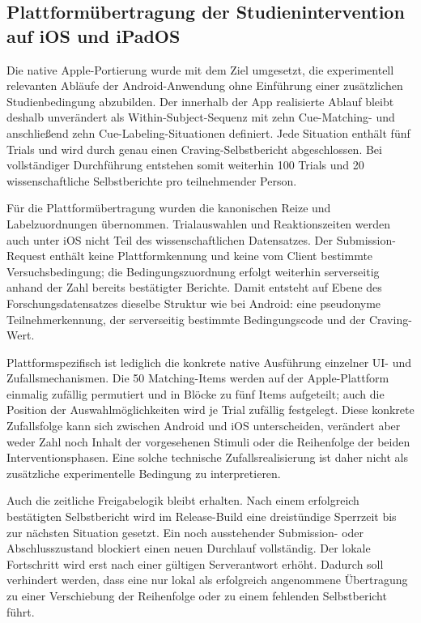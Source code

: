 
\begin{neu}
\section{Plattformübertragung der Studienintervention auf iOS und iPadOS}

Die native Apple-Portierung wurde mit dem Ziel umgesetzt, die experimentell relevanten Abläufe der Android-Anwendung ohne Einführung einer zusätzlichen Studienbedingung abzubilden. Der innerhalb der App realisierte Ablauf bleibt deshalb unverändert als Within-Subject-Sequenz mit zehn Cue-Matching- und anschließend zehn Cue-Labeling-Situationen definiert. Jede Situation enthält fünf Trials und wird durch genau einen Craving-Selbstbericht abgeschlossen. Bei vollständiger Durchführung entstehen somit weiterhin 100 Trials und 20 wissenschaftliche Selbstberichte pro teilnehmender Person.

Für die Plattformübertragung wurden die kanonischen Reize und Labelzuordnungen übernommen. Trialauswahlen und Reaktionszeiten werden auch unter iOS nicht Teil des wissenschaftlichen Datensatzes. Der Submission-Request enthält keine Plattformkennung und keine vom Client bestimmte Versuchsbedingung; die Bedingungszuordnung erfolgt weiterhin serverseitig anhand der Zahl bereits bestätigter Berichte. Damit entsteht auf Ebene des Forschungsdatensatzes dieselbe Struktur wie bei Android: eine pseudonyme Teilnehmerkennung, der serverseitig bestimmte Bedingungscode und der Craving-Wert.

Plattformspezifisch ist lediglich die konkrete native Ausführung einzelner UI- und Zufallsmechanismen. Die 50 Matching-Items werden auf der Apple-Plattform einmalig zufällig permutiert und in Blöcke zu fünf Items aufgeteilt; auch die Position der Auswahlmöglichkeiten wird je Trial zufällig festgelegt. Diese konkrete Zufallsfolge kann sich zwischen Android und iOS unterscheiden, verändert aber weder Zahl noch Inhalt der vorgesehenen Stimuli oder die Reihenfolge der beiden Interventionsphasen. Eine solche technische Zufallsrealisierung ist daher nicht als zusätzliche experimentelle Bedingung zu interpretieren.

Auch die zeitliche Freigabelogik bleibt erhalten. Nach einem erfolgreich bestätigten Selbstbericht wird im Release-Build eine dreistündige Sperrzeit bis zur nächsten Situation gesetzt. Ein noch ausstehender Submission- oder Abschlusszustand blockiert einen neuen Durchlauf vollständig. Der lokale Fortschritt wird erst nach einer gültigen Serverantwort erhöht. Dadurch soll verhindert werden, dass eine nur lokal als erfolgreich angenommene Übertragung zu einer Verschiebung der Reihenfolge oder zu einem fehlenden Selbstbericht führt.


\end{neu}
